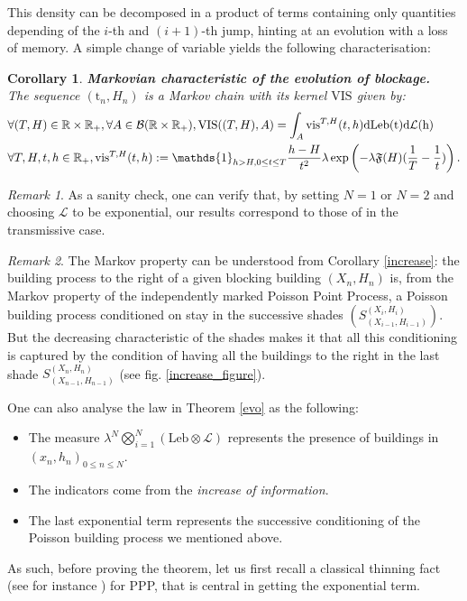 \documentclass[10pt,english,a4paper]{smfart}
\newtheorem{corollary}{Corollary}[section]
\theoremstyle{definition}
\theoremstyle{remark}
\newtheorem{remark}{Remark}
\newcommand{\R}{\mathbb{R}}
\newcommand{\Leb}{\mathrm{Leb}}
\newcommand{\Half}{\R \times \R_+}
\newcommand{\primi}{\mathfrak{F}}
\begin{document}
This density can be decomposed in a product of terms containing only quantities depending of the $i$-th and $(i+1)$-th jump, hinting at an evolution with a loss of memory. A simple change of variable yields the following characterisation:

\begin{corollary}\label{Markov}\textbf{Markovian characteristic of the evolution of blockage.}\\
    The sequence $(\mathrm{t}_n, H_n)$ is a Markov chain with its kernel $\mathrm{VIS}$ given by:
    \begin{align*}
        &\forall (T, H)\in \Half, \forall A \in \mathcal{B}(\Half), \mathrm{VIS}((T, H), A) = \int_A \mbox{vis}^{T, H}(t, h) \rm{d}\Leb(t) \rm{d}\mathcal{L}(h)\\
        &\forall T, H, t, h \in \R_+, \mbox{vis}^{T, H} (t, h) :=\mathds{1}_{h> H, 0\leq t\leq  T} \frac{h-H}{t^2}\lambda \exp\left(-\lambda \primi(H)(\frac{1}{T}-\frac{1}{t})\right).
    \end{align*}
\end{corollary}

\begin{remark}
As a sanity check, one can verify that, by setting $N = 1$ or $N=2$ and choosing $\mathcal{L}$ to be exponential, our results correspond to those of \cite{Junse_Francois} in the transmissive case.
\end{remark}

\begin{remark}
The Markov property can be understood from Corollary \ref{increase}: the building process to the right of a given blocking building $(X_n, H_n)$ is, from the Markov property of the independently marked Poisson Point Process, a Poisson building process conditioned on stay in the successive shades $\left(S^{(X_i,H_i)}_{(X_{i-1}, H_{i-1})}\right)$. But the decreasing characteristic of the shades makes it that all this conditioning is captured by the condition of having all the buildings to the right in the last shade $S^{(X_n,H_n)}_{(X_{n-1}, H_{n-1})}$ (see fig. \ref{increase_figure}).
\end{remark}

One can also analyse the law in Theorem \ref{evo} as the following:
\begin{itemize}
    \item The measure $\lambda^N\displaystyle\bigotimes_{i=1}^{N} (\Leb \otimes \mathcal{L})$ represents the presence of buildings in $(x_n, h_n)_{0\leq n\leq N}$.
    \item The indicators come from the \textit{increase of information}.
    \item The last exponential term represents the successive conditioning of the Poisson building process we mentioned above.
\end{itemize}
As such, before proving the theorem, let us first recall a classical thinning fact (see for instance \cite{baccelli_random_2024}) for PPP, that is central in getting the exponential term.
\end{document}
